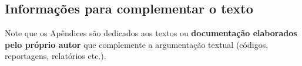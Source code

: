 
\begin{apendicesenv}
\chapter{Informações para complementar o texto}

Note que os Apêndices são dedicados aos textos ou \textbf{documentação elaborados pelo próprio autor} que complemente  a  argumentação  textual  (códigos,  reportagens,  relatórios  etc.).

\lipsum[8]



\end{apendicesenv}